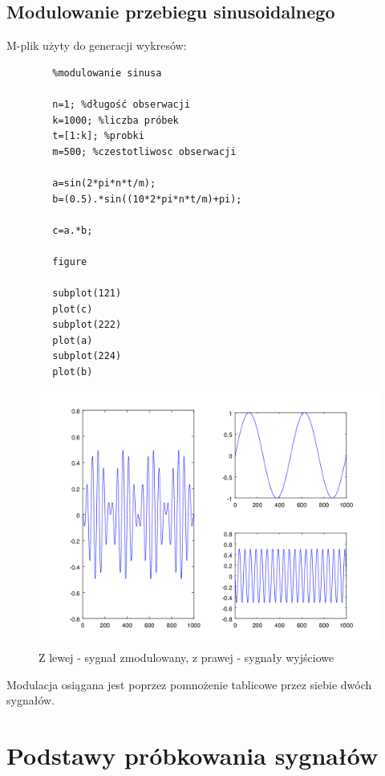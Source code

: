\documentclass[12pt,titlepage]{report}
\begin{document}
\subsection{Modulowanie przebiegu sinusoidalnego}
M-plik użyty do generacji wykresów:
\begin{multicols}{2}
	{
		\tiny
		\begin{verbatim}
		%modulowanie sinusa
		
		n=1; %długość obserwacji
		k=1000; %liczba próbek
		t=[1:k]; %probki
		m=500; %czestotliwosc obserwacji
		
		a=sin(2*pi*n*t/m);
		b=(0.5).*sin((10*2*pi*n*t/m)+pi);
		
		c=a.*b;
		
		figure
		
		subplot(121)
		plot(c)
		subplot(222)
		plot(a)
		subplot(224)
		plot(b)
		\end{verbatim}
	}
\end{multicols}

\begin{figure}[!h]
	\centering
	\includegraphics[scale=0.4]{../cw07_output}
	\caption{Z lewej - sygnał zmodulowany, z prawej - sygnały wyjściowe}
\end{figure}
Modulacja osiągana jest poprzez pomnożenie tablicowe przez siebie dwóch sygnałów.
\newpage

\section{Podstawy próbkowania sygnałów}
\end{document}
